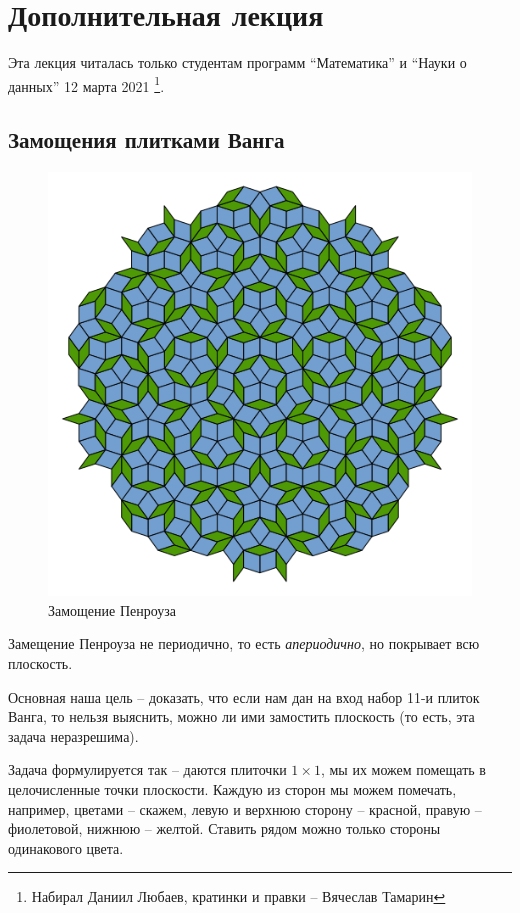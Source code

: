 \chapter{Дополнительная лекция}
Эта лекция читалась только студентам программ ``Математика'' и ``Науки о данных'' 12 марта 2021
\footnote{Набирал Даниил Любаев, кратинки и правки -- Вячеслав Тамарин}.
\section{Замощения плитками Ванга}

\begin{figure}[ht]
    \centering
	\includegraphics[scale=0.75]{./imgs/Penrose_Tiling.png}
	\caption{Замощение Пенроуза}
\end{figure}
Замещение Пенроуза не периодично, то есть \textit{апериодично}, но покрывает всю плоскость.

Основная наша цель -- доказать, что если нам дан на вход набор 11-и плиток Ванга, то
нельзя выяснить, можно ли ими замостить плоскость (то есть, эта задача неразрешима).

Задача формулируется так -- даются плиточки $ 1 \times 1 $, мы их можем помещать в целочисленные точки плоскости. Каждую из сторон мы можем помечать, например, цветами -- скажем, левую и верхнюю сторону -- красной, правую -- фиолетовой, нижнюю -- желтой. Ставить рядом можно только стороны одинакового цвета.


